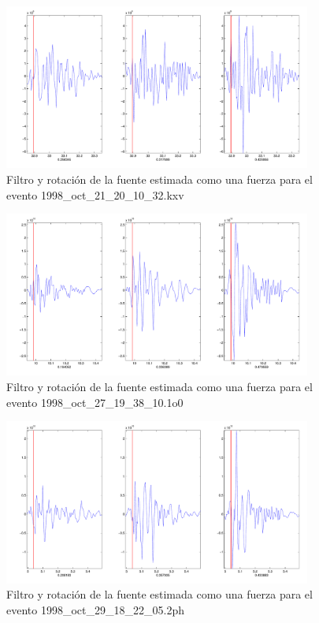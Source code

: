 \begin{figure}[H]
\includegraphics[width=0.9\textwidth,height=0.4\textheight]{linea_timerev/figuras/plotSrcEv22filtrotsrc.pdf}
\caption{Filtro y rotación de la fuente estimada como una fuerza para el
evento 1998\_oct\_21\_20\_10\_32.kxv}
\end{figure}
\begin{figure}[H]
\includegraphics[width=0.9\textwidth,height=0.4\textheight]{linea_timerev/figuras/plotSrcEv23filtrotsrc.pdf}
\caption{Filtro y rotación de la fuente estimada como una fuerza para el
evento 1998\_oct\_27\_19\_38\_10.1o0}
\end{figure}
\begin{figure}[H]
\includegraphics[width=0.9\textwidth,height=0.4\textheight]{linea_timerev/figuras/plotSrcEv24filtrotsrc.pdf}
\caption{Filtro y rotación de la fuente estimada como una fuerza para el
evento 1998\_oct\_29\_18\_22\_05.2ph}
\end{figure}
